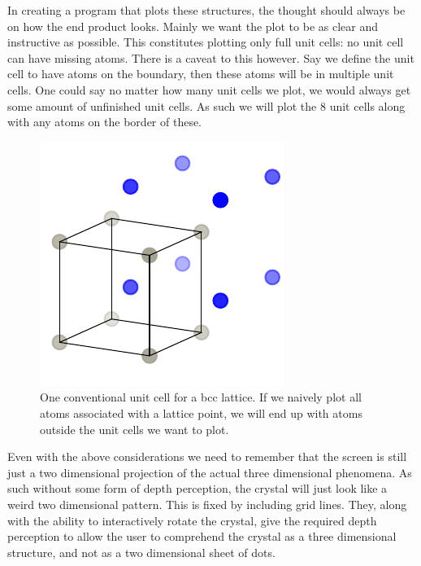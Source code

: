\documentclass[main.tex]{subfiles}
\begin{document}
	In creating a program that plots these structures, the thought should always be on how the end product looks. Mainly we want the plot to be as clear and instructive as possible. This constitutes plotting only full unit cells: no unit cell can have missing atoms. There is a caveat to this however. Say we define the unit cell to have atoms on the boundary, then these atoms will be in multiple unit cells. One could say no matter how many unit cells we plot, we would always get some amount of unfinished unit cells. As such we will plot the 8 unit cells along with any atoms on the border of these.
	\begin{figure}
		\begin{center}
			\includegraphics[width=\linewidth]{figures/lattice_unfinished_1.pdf}
		\end{center}
		\caption{One conventional unit cell for a bcc lattice. If we naively plot all atoms associated with a lattice point, we will end up with atoms outside the unit cells we want to plot.}
		\label{fig:lattice_unfinished_1}
	\end{figure}
	
	Even with the above considerations we need to remember that the screen is still just a two dimensional projection of the actual three dimensional phenomena. As such without some form of depth perception, the crystal will just look like a weird two dimensional pattern. This is fixed by including grid lines. They, along with the ability to interactively rotate the crystal, give the required depth perception to allow the user to comprehend the crystal as a three dimensional structure, and not as a two dimensional sheet of dots. 
	
\end{document}

